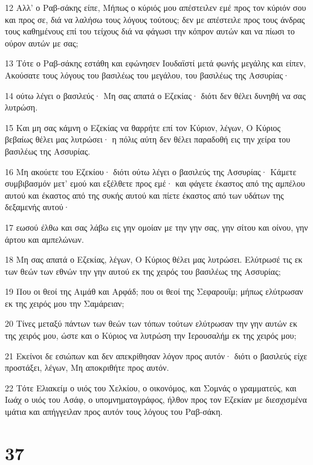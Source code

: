 \par 12 Αλλ' ο Ραβ-σάκης είπε, Μήπως ο κύριός μου απέστειλεν εμέ προς τον κύριόν σου και προς σε, διά να λαλήσω τους λόγους τούτους; δεν με απέστειλε προς τους άνδρας τους καθημένους επί του τείχους διά να φάγωσι την κόπρον αυτών και να πίωσι το ούρον αυτών με σας;
\par 13 Τότε ο Ραβ-σάκης εστάθη και εφώνησεν Ιουδαϊστί μετά φωνής μεγάλης και είπεν, Ακούσατε τους λόγους του βασιλέως του μεγάλου, του βασιλέως της Ασσυρίας·
\par 14 ούτω λέγει ο βασιλεύς· Μη σας απατά ο Εζεκίας· διότι δεν θέλει δυνηθή να σας λυτρώση.
\par 15 Και μη σας κάμνη ο Εζεκίας να θαρρήτε επί τον Κύριον, λέγων, Ο Κύριος βεβαίως θέλει μας λυτρώσει· η πόλις αύτη δεν θέλει παραδοθή εις την χείρα του βασιλέως της Ασσυρίας.
\par 16 Μη ακούετε του Εζεκίου· διότι ούτω λέγει ο βασιλεύς της Ασσυρίας· Κάμετε συμβιβασμόν μετ' εμού και εξέλθετε προς εμέ· και φάγετε έκαστος από της αμπέλου αυτού και έκαστος από της συκής αυτού και πίετε έκαστος από των υδάτων της δεξαμενής αυτού·
\par 17 εωσού έλθω και σας λάβω εις γην ομοίαν με την γην σας, γην σίτου και οίνου, γην άρτου και αμπελώνων.
\par 18 Μη σας απατά ο Εζεκίας, λέγων, Ο Κύριος θέλει μας λυτρώσει. Ελύτρωσέ τις εκ των θεών των εθνών την γην αυτού εκ της χειρός του βασιλέως της Ασσυρίας;
\par 19 Που οι θεοί της Αιμάθ και Αρφάδ; που οι θεοί της Σεφαρουΐμ; μήπως ελύτρωσαν εκ της χειρός μου την Σαμάρειαν;
\par 20 Τίνες μεταξύ πάντων των θεών των τόπων τούτων ελύτρωσαν την γην αυτών εκ της χειρός μου, ώστε και ο Κύριος να λυτρώση την Ιερουσαλήμ εκ της χειρός μου;
\par 21 Εκείνοι δε εσιώπων και δεν απεκρίθησαν λόγον προς αυτόν· διότι ο βασιλεύς είχε προστάξει, λέγων, Μη αποκριθήτε προς αυτόν.
\par 22 Τότε Ελιακείμ ο υιός του Χελκίου, ο οικονόμος, και Σομνάς ο γραμματεύς, και Ιωάχ ο υιός του Ασάφ, ο υπομνηματογράφος, ήλθον προς τον Εζεκίαν με διεσχισμένα ιμάτια και απήγγειλαν προς αυτόν τους λόγους του Ραβ-σάκη.

\chapter{37}

